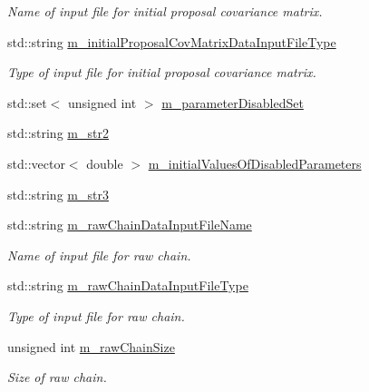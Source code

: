 \begin{DoxyCompactItemize}
\begin{DoxyCompactList}\small\item\em Name of input file for initial proposal covariance matrix. \end{DoxyCompactList}\item 
std\-::string \hyperlink{class_q_u_e_s_o_1_1_m_l_sampling_level_options_a6e6ea2f36afd7b6a6900eaf44165a796}{m\-\_\-initial\-Proposal\-Cov\-Matrix\-Data\-Input\-File\-Type}
\begin{DoxyCompactList}\small\item\em Type of input file for initial proposal covariance matrix. \end{DoxyCompactList}\item 
std\-::set$<$ unsigned int $>$ \hyperlink{class_q_u_e_s_o_1_1_m_l_sampling_level_options_a0c5c308a5b9e0150be59ad52a48e6ab9}{m\-\_\-parameter\-Disabled\-Set}
\item 
std\-::string \hyperlink{class_q_u_e_s_o_1_1_m_l_sampling_level_options_ab91c7af5bfcfeb0466970713e2655e3a}{m\-\_\-str2}
\item 
std\-::vector$<$ double $>$ \hyperlink{class_q_u_e_s_o_1_1_m_l_sampling_level_options_a50cbdab5fe9fbda97aca16d206888a18}{m\-\_\-initial\-Values\-Of\-Disabled\-Parameters}
\item 
std\-::string \hyperlink{class_q_u_e_s_o_1_1_m_l_sampling_level_options_ab373068cdb371c781603dbb2b75ae14d}{m\-\_\-str3}
\item 
std\-::string \hyperlink{class_q_u_e_s_o_1_1_m_l_sampling_level_options_a192498743c73fa9244c8652530beebb2}{m\-\_\-raw\-Chain\-Data\-Input\-File\-Name}
\begin{DoxyCompactList}\small\item\em Name of input file for raw chain. \end{DoxyCompactList}\item 
std\-::string \hyperlink{class_q_u_e_s_o_1_1_m_l_sampling_level_options_af216317de1aba551bfddd2be38e26898}{m\-\_\-raw\-Chain\-Data\-Input\-File\-Type}
\begin{DoxyCompactList}\small\item\em Type of input file for raw chain. \end{DoxyCompactList}\item 
unsigned int \hyperlink{class_q_u_e_s_o_1_1_m_l_sampling_level_options_a8ab85efacd9881ab35b9f01b6e4fc5a3}{m\-\_\-raw\-Chain\-Size}
\begin{DoxyCompactList}\small\item\em Size of raw chain. \end{DoxyCompactList}\item 

\end{DoxyCompactItemize}
